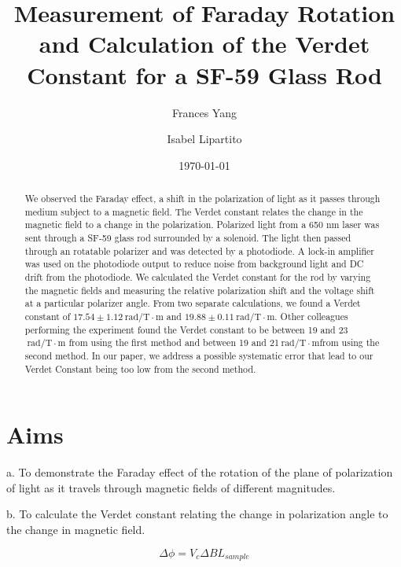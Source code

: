 \documentclass[prb,preprint]{revtex4-1}
\begin{document}
\title{Measurement of Faraday Rotation and Calculation of the Verdet Constant for a SF-59 Glass Rod}

\author{Frances Yang}

\author{Isabel Lipartito}

\date{\today}

\begin{abstract}
{We observed the Faraday effect, a shift in the polarization of light as it passes through medium subject to a magnetic field. The Verdet constant relates the change in the magnetic field to a change in the polarization.  Polarized light from a 650 nm laser was sent through a SF-59 glass rod surrounded by a solenoid. The light then passed through an rotatable polarizer and was detected by a photodiode. A lock-in amplifier was used on the photodiode output to reduce noise from background light and DC drift from the photodiode. We calculated the Verdet constant for the rod by varying the magnetic fields and measuring the relative polarization shift and the voltage shift at a particular polarizer angle. From two separate calculations, we found a Verdet constant of $17.54 \pm 1.12 \mathrm{~rad/T} \cdot \textrm{m}$ and $19.88 \pm 0.11 \mathrm{~rad/T} \cdot \textrm{m}$. Other colleagues performing the experiment found the Verdet constant to be between 19 and 23$\mathrm{~rad/T} \cdot \textrm{m}$ from using the first method and between 19 and 21$\mathrm{~rad/T} \cdot \textrm{m} $from using the second method.  In our paper, we address a possible systematic error that lead to our Verdet Constant being too low from the second method.
}
\end{abstract}

\maketitle 
\section{Aims}
{a.  To demonstrate the Faraday effect of the rotation of the plane of polarization of light as it travels through magnetic fields of different magnitudes.

b.  To calculate the Verdet constant relating the change in polarization angle to the change in magnetic field.}
\begin{equation}
\Delta \phi =V_{c} \Delta B L{_{sample}}
\end{equation}
\end{document}
